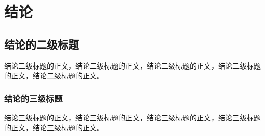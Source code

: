 \section{结论\label{结论}}

\subsection{结论的二级标题}

结论二级标题的正文，结论二级标题的正文，结论二级标题的正文，结论二级标题的正文，结论二级标题的正文。

\subsubsection{结论的三级标题}

结论三级标题的正文，结论三级标题的正文，结论三级标题的正文，结论三级标题的正文，结论三级标题的正文。